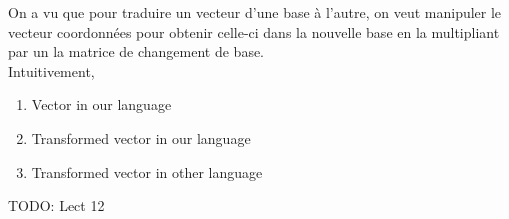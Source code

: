 \documentclass{article}
\begin{document}

\begin{intuition}
    On a vu que pour traduire un vecteur d'une base à l'autre, on
    veut manipuler le vecteur coordonnées pour obtenir celle-ci
    dans la nouvelle base en la multipliant par un la matrice de
    changement de base.\\
    Intuitivement,
    \begin{enumerate}
        \item Vector in our language
	\item Transformed vector in our language
	\item Transformed vector in other language
    \end{enumerate}
\end{intuition}


TODO: Lect 12
\end{document}

